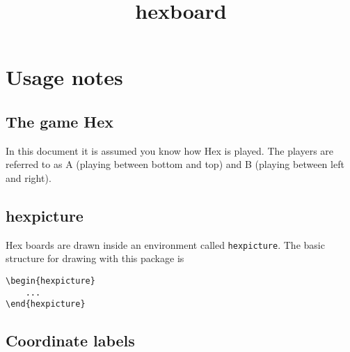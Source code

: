 \documentclass[a4paper,12pt]{article}
\title{hexboard}
\author{}
\date{}
\begin{document}
   
    
    \maketitle 
    
    \begin{center}
        \begin{hexgame}[4]
        \end{hexgame}
    \end{center}
    
    \tableofcontents
    
    \section{Usage notes}
    
    \subsection{The game Hex}
    
    In this document it is assumed you know how Hex is played. The players are referred to as A (playing between bottom and top) and B (playing between left and right).
    
    \subsection{hexpicture}
    
    Hex boards are drawn inside an environment called \verb|hexpicture|. The basic structure for drawing with this package is 
    
    \begin{verbatim}\begin{hexpicture}
    ...
\end{hexpicture}\end{verbatim}
    
    \subsection{Coordinate labels}
    
\end{document}
